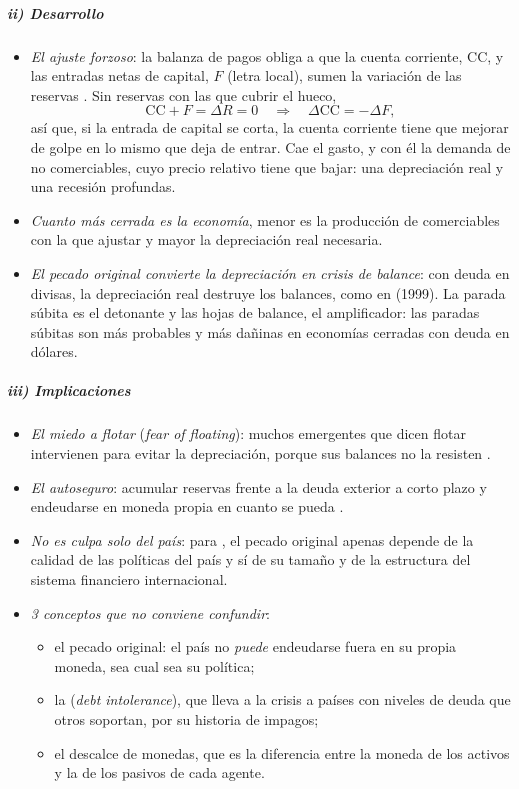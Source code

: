 \documentclass[11pt]{article}
\begin{document}
\subparagraph{ii) Desarrollo}

\begin{itemize}
\item \emph{El ajuste forzoso}: la balanza de pagos obliga a que la cuenta corriente, $\mathrm{CC}$, y las entradas netas de capital, $F$ (letra local), sumen la variación de las reservas . Sin reservas con las que cubrir el hueco,
  \begin{equation}\label{eq:parada-ajuste}
  \mathrm{CC}+F=\Delta R=0\quad\Longrightarrow\quad \Delta\mathrm{CC}=-\Delta F ,
  \end{equation}
  así que, si la entrada de capital se corta, la cuenta corriente tiene que mejorar de golpe en lo mismo que deja de entrar. Cae el gasto, y con él la demanda de no comerciables, cuyo precio relativo tiene que bajar: una depreciación real y una recesión profundas\nocite{Calvo1998SuddenStops}.
\item \emph{Cuanto más cerrada es la economía}, menor es la producción de comerciables con la que ajustar y mayor la depreciación real necesaria.
\item \emph{El pecado original convierte la depreciación en crisis de balance}: con deuda en divisas, la depreciación real destruye los balances, como en  (1999). La parada súbita es el detonante y las hojas de balance, el amplificador: las paradas súbitas son más probables y más dañinas en economías cerradas con deuda en dólares\nocite{CIM2004SuddenStops}.
\end{itemize}

\subparagraph{iii) Implicaciones}

\begin{itemize}
\item \emph{El miedo a flotar} (\emph{fear of floating}): muchos emergentes que dicen flotar intervienen para evitar la depreciación, porque sus balances no la resisten\nocite{CalvoReinhart2002} .
\item \emph{El autoseguro}: acumular reservas frente a la deuda exterior a corto plazo y endeudarse en moneda propia en cuanto se pueda .
\item \emph{No es culpa solo del país}: para \textcite{EHP2005PecadoOriginal}, el pecado original apenas depende de la calidad de las políticas del país y sí de su tamaño y de la estructura del sistema financiero internacional.
\item \emph{3 conceptos que no conviene confundir}\nocite{EHP2003Mismatches}:
  \begin{itemize}
  \item el pecado original: el país no \emph{puede} endeudarse fuera en su propia moneda, sea cual sea su política;
  \item la  (\emph{debt intolerance}), que lleva a la crisis a países con niveles de deuda que otros soportan, por su historia de impagos\nocite{Reinhart2003Intolerancia};
  \item el descalce de monedas, que es la diferencia entre la moneda de los activos y la de los pasivos de cada agente.
  \end{itemize}
\end{itemize}
\end{document}
